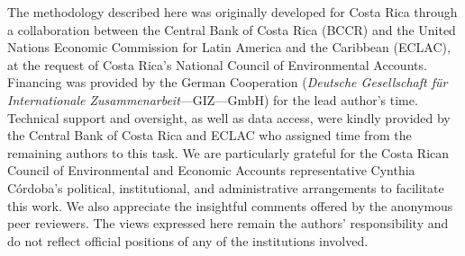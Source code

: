 \documentclass[
  letterpaper,
  DIV=11,
  numbers=noendperiod]{scrartcl}
\begin{document}
The methodology described here was originally developed for Costa Rica
through a collaboration between the Central Bank of Costa Rica (BCCR)
and the United Nations Economic Commission for Latin America and the
Caribbean (ECLAC), at the request of Costa Rica's National Council of
Environmental Accounts. Financing was provided by the German Cooperation
(\emph{Deutsche Gesellschaft für Internationale
Zusammenarbeit}---GIZ---GmbH) for the lead author's time. Technical
support and oversight, as well as data access, were kindly provided by
the Central Bank of Costa Rica and ECLAC who assigned time from the
remaining authors to this task. We are particularly grateful for the
Costa Rican Council of Environmental and Economic Accounts
representative Cynthia Córdoba's political, institutional, and
administrative arrangements to facilitate this work. We also appreciate
the insightful comments offered by the anonymous peer reviewers. The
views expressed here remain the authors' responsibility and do not
reflect official positions of any of the institutions involved.
\end{document}

